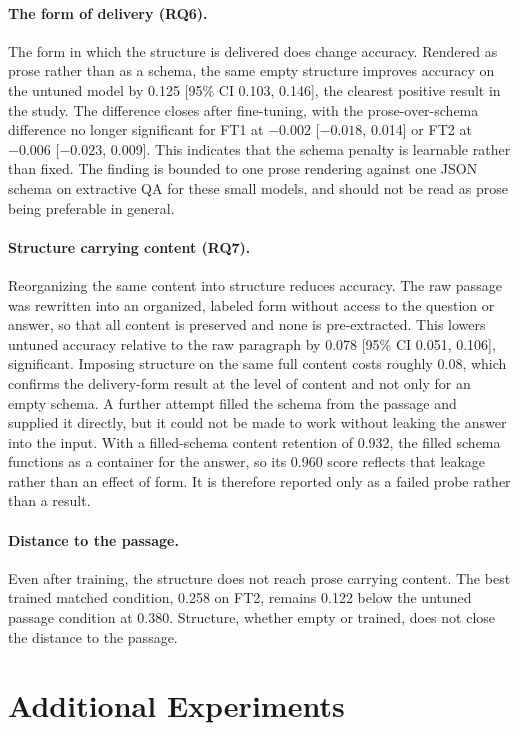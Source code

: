 \documentclass[master]{thesis}
\begin{document}
\paragraph{The form of delivery (RQ6).}
The form in which the structure is delivered does change accuracy. Rendered as prose rather than as a schema, the same empty structure improves accuracy on the untuned model by 0.125 [95\% CI 0.103, 0.146], the clearest positive result in the study. The difference closes after fine-tuning, with the prose-over-schema difference no longer significant for FT1 at $-0.002$ [$-0.018$, 0.014] or FT2 at $-0.006$ [$-0.023$, 0.009]. This indicates that the schema penalty is learnable rather than fixed. The finding is bounded to one prose rendering against one JSON schema on extractive QA for these small models, and should not be read as prose being preferable in general.

\paragraph{Structure carrying content (RQ7).}
Reorganizing the same content into structure reduces accuracy. The raw passage was rewritten into an organized, labeled form without access to the question or answer, so that all content is preserved and none is pre-extracted. This lowers untuned accuracy relative to the raw paragraph by 0.078 [95\% CI 0.051, 0.106], significant. Imposing structure on the same full content costs roughly 0.08, which confirms the delivery-form result at the level of content and not only for an empty schema. A further attempt filled the schema from the passage and supplied it directly, but it could not be made to work without leaking the answer into the input. With a filled-schema content retention of 0.932, the filled schema functions as a container for the answer, so its 0.960 score reflects that leakage rather than an effect of form. It is therefore reported only as a failed probe rather than a result.

\paragraph{Distance to the passage.}
Even after training, the structure does not reach prose carrying content. The best trained matched condition, 0.258 on FT2, remains 0.122 below the untuned passage condition at 0.380. Structure, whether empty or trained, does not close the distance to the passage.

\section{Additional Experiments}
\label{sec:exploratory}
\end{document}
